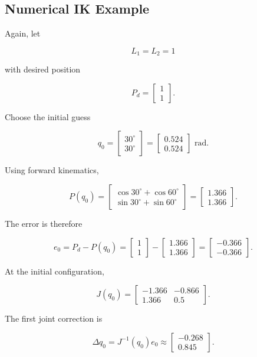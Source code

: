\documentclass{article}
\begin{document}
\subsection{Numerical IK Example}

Again, let

\[
L_1=L_2=1
\]

with desired position

\[
P_d=
\begin{bmatrix}
1\\
1
\end{bmatrix}.
\]

Choose the initial guess

\[
q_0=
\begin{bmatrix}
30^\circ\\
30^\circ
\end{bmatrix}
=
\begin{bmatrix}
0.524\\
0.524
\end{bmatrix}
\text{ rad}.
\]

Using forward kinematics,

\[
P(q_0)
=
\begin{bmatrix}
\cos30^\circ+\cos60^\circ\\
\sin30^\circ+\sin60^\circ
\end{bmatrix}
=
\begin{bmatrix}
1.366\\
1.366
\end{bmatrix}.
\]

The error is therefore

\[
e_0
=
P_d-P(q_0)
=
\begin{bmatrix}
1\\
1
\end{bmatrix}
-
\begin{bmatrix}
1.366\\
1.366
\end{bmatrix}
=
\begin{bmatrix}
-0.366\\
-0.366
\end{bmatrix}.
\]

At the initial configuration,

\[
J(q_0)
=
\begin{bmatrix}
-1.366 & -0.866\\
1.366 & 0.5
\end{bmatrix}.
\]

The first joint correction is

\[
\Delta q_0
=
J^{-1}(q_0)e_0
\approx
\begin{bmatrix}
-0.268\\
0.845
\end{bmatrix}.
\]
\end{document}
